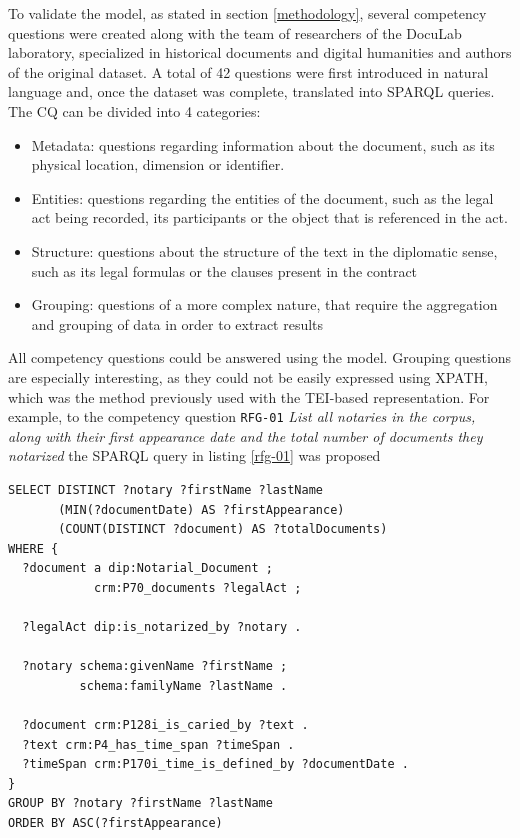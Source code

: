 \documentclass{article}
\begin{document}
To validate the model, as stated in section \ref{methodology}, several competency questions were created along with the team of researchers of the DocuLab laboratory, specialized in historical documents and digital humanities and authors of the original dataset.
A total of 42 questions were first introduced in natural language and, once the dataset was complete, translated into SPARQL queries.
The CQ can be divided into 4 categories:
\begin{itemize}
    \item Metadata: questions regarding information about the document, such as its physical location, dimension or identifier.
    \item Entities: questions regarding the entities of the document, such as the legal act being recorded, its participants or the object that is referenced in the act.
    \item Structure: questions about the structure of the text in the diplomatic sense, such as its legal formulas or the clauses present in the contract
    \item Grouping: questions of a more complex nature, that require the aggregation and grouping of data in order to extract results
\end{itemize}

All competency questions could be answered using the model.
Grouping questions are especially interesting, as they could not be easily expressed using XPATH, which was the method previously used with the TEI-based representation.
For example, to the competency question \texttt{RFG-01} \emph{List all notaries in the corpus, along with their first appearance date and the total number of documents they notarized} the SPARQL query in listing  \ref{rfg-01} was proposed

\begin{lstlisting}[language=SPARQL, label={rfg-01}, caption=SPARQL query corresponding to competency question \texttt{RFG-01}]
SELECT DISTINCT ?notary ?firstName ?lastName
       (MIN(?documentDate) AS ?firstAppearance)
       (COUNT(DISTINCT ?document) AS ?totalDocuments)
WHERE {
  ?document a dip:Notarial_Document ;
            crm:P70_documents ?legalAct ;

  ?legalAct dip:is_notarized_by ?notary .

  ?notary schema:givenName ?firstName ;
          schema:familyName ?lastName .

  ?document crm:P128i_is_caried_by ?text .
  ?text crm:P4_has_time_span ?timeSpan .
  ?timeSpan crm:P170i_time_is_defined_by ?documentDate .
}
GROUP BY ?notary ?firstName ?lastName
ORDER BY ASC(?firstAppearance)
\end{lstlisting}
\end{document}
